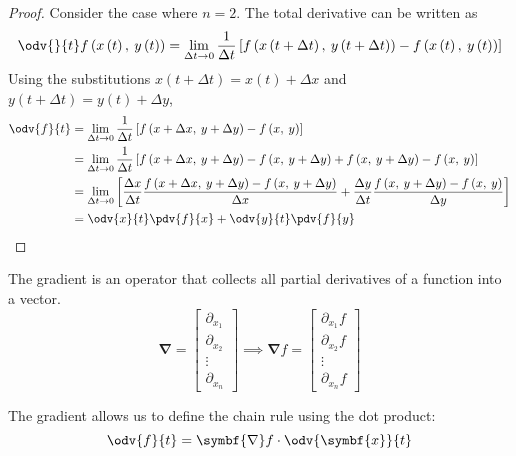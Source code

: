 \documentclass{article}
\begin{document}
\begin{proof}
    Consider the case where \(n = 2\). The total derivative can be written as
    \begin{equation*}
        \odv{}{t} f\left( x\left( t \right),\: y\left( t \right) \right) = \lim_{\Delta{t} \to 0} \frac{1}{\Delta{t}} \left[ f\left( x\left( t + \Delta{t} \right),\: y\left( t + \Delta{t} \right) \right) - f\left( x\left( t \right),\: y\left( t \right) \right) \right]
    \end{equation*}
    Using the substitutions \(x\left( t + \Delta{t} \right) = x\left( t \right) + \Delta{x}\) and \(y\left( t + \Delta{t} \right) = y\left( t \right) + \Delta{y}\),
    \begin{align*}
        \odv{f}{t} & = \lim_{\Delta{t} \to 0} \frac{1}{\Delta{t}} \left[ f\left( x + \Delta{x},\: y + \Delta{y} \right) - f\left( x,\: y \right) \right]                                                                                                                                                   \\
                   & = \lim_{\Delta{t} \to 0} \frac{1}{\Delta{t}} \left[ f\left( x + \Delta{x},\: y + \Delta{y} \right) - f\left( x,\: y + \Delta{y} \right) + f\left( x,\: y + \Delta{y} \right) - f\left( x,\: y \right) \right]                                                                         \\
                   & = \lim_{\Delta{t} \to 0} \left[ \frac{\Delta{x}}{\Delta{t}} \frac{f\left( x + \Delta{x},\: y + \Delta{y} \right) - f\left( x,\: y + \Delta{y} \right)}{\Delta{x}} + \frac{\Delta{y}}{\Delta{t}} \frac{f\left( x,\: y + \Delta{y} \right) - f\left( x,\: y \right)}{\Delta{y}} \right] \\
                   & = \odv{x}{t} \pdv{f}{x} + \odv{y}{t} \pdv{f}{y}
    \end{align*}
\end{proof}
\begin{definition}[Gradient]
    The gradient is an operator that collects all partial derivatives of a function into a vector.
    \begin{equation*}
        \symbf{\nabla} =
        \begin{bmatrix}
            \partial_{x_1} \\
            \partial_{x_2} \\ \vdots \\
            \partial_{x_n}
        \end{bmatrix}
        \implies \symbf{\nabla} f =
        \begin{bmatrix}
            \partial_{x_1} f \\
            \partial_{x_2} f \\ \vdots \\
            \partial_{x_n} f
        \end{bmatrix}
    \end{equation*}
\end{definition}
The gradient allows us to define the chain rule using the dot product:
\begin{equation*}
    \odv{f}{t} = \symbf{\nabla} f \cdot \odv{\symbf{x}}{t}
\end{equation*}
\end{document}
